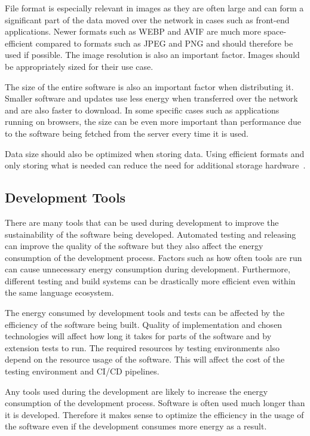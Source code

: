 File format is especially relevant in images as they are often large and can form a significant part of the data moved over the network in cases such as front-end applications. Newer formats such as WEBP and AVIF are much more space-efficient compared to formats such as JPEG and PNG and should therefore be used if possible. The image resolution is also an important factor. Images should be appropriately sized for their use case.

The size of the entire software is also an important factor when distributing it. Smaller software and updates use less energy when transferred over the network and are also faster to download. In some specific cases such as applications running on browsers, the size can be even more important than performance due to the software being fetched from the server every time it is used.

Data size should also be optimized when storing data. Using efficient formats and only storing what is needed can reduce the need for additional storage hardware~\cite{greensoftwareGreenSoftware}.

\subsection{Development Tools}
There are many tools that can be used during development to improve the sustainability of the software being developed. Automated testing and releasing can improve the quality of the software but they also affect the energy consumption of the development process.
Factors such as how often tools are run can cause unnecessary energy consumption during development. Furthermore, different testing and build systems can be drastically more efficient even within the same language ecosystem.

The energy consumed by development tools and tests can be affected by the efficiency of the software being built. Quality of implementation and chosen technologies will affect how long it takes for parts of the software and by extension tests to run. The required resources by testing environments also depend on the resource usage of the software. This will affect the cost of the testing environment and CI/CD pipelines.

Any tools used during the development are likely to increase the energy consumption of the development process. Software is often used much longer than it is developed. Therefore it makes sense to optimize the efficiency in the usage of the software even if the development consumes more energy as a result.


